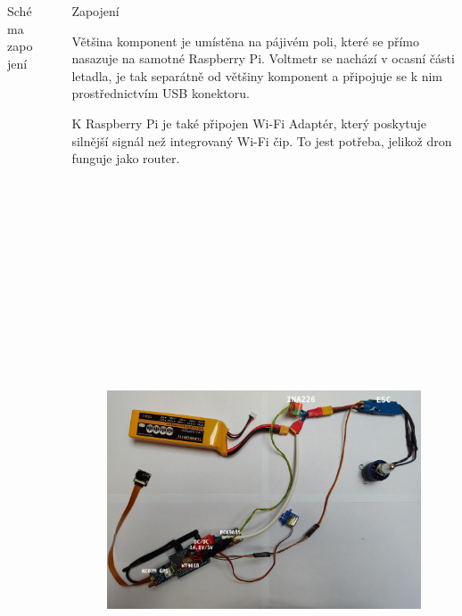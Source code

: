 \documentclass[final]{beamer}
\newlength{\sepwidth}
\newlength{\colwidth}
\newcommand{\separatorcolumn}{\begin{column}{\sepwidth}\end{column}}
\begin{document}
\begin{frame}[t]
\begin{columns}[t]
\begin{column}{\colwidth}
\begin{block}{Schéma zapojení}
      \end{block}

    \end{column}

    \separatorcolumn

    \begin{column}{\colwidth}

			\begin{block}{Zapojení}

				Většina komponent je umístěna na pájivém poli, které se přímo nasazuje na samotné Raspberry Pi.
				Voltmetr se nachází v ocasní části letadla, je tak separátně od většiny komponent a připojuje se k nim prostřednictvím USB konektoru.

				K Raspberry Pi je také připojen Wi-Fi Adaptér, který poskytuje silnější signál než integrovaný Wi-Fi čip.
				To jest potřeba, jelikož dron funguje jako router.

				\begin{figure}[h]
					\centering
					\includegraphics[height=19cm]{./circuit.jpg}
				\end{figure}


\end{block}
\end{column}
\end{columns}
\end{frame}
\end{document}
